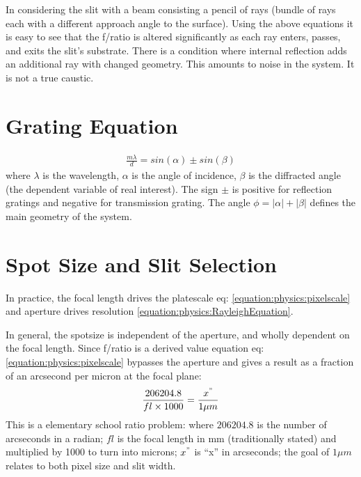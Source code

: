 \documentclass[letterpaper,10pt,english,openany,oneside]{sphinxmanual}
\begin{document}
\sphinxAtStartPar
In considering the  slit with a beam consisting a pencil of rays
(bundle of rays \textendash{} each with a different approach angle to the
surface). Using the above equations it is easy to see that the f/ratio
is altered significantly as each ray enters, passes, and exits the
slit’s substrate. There is a condition where internal reflection adds
an additional ray with changed geometry.  This amounts to noise in the
system. It is not a true caustic.


\section{Grating Equation}
\label{\detokenize{physics:grating-equation}}\begin{equation}\label{equation:physics:grating}
\begin{split}\frac{m\lambda}{d} = sin(\alpha) \pm sin(\beta)\end{split}
\end{equation}
\sphinxAtStartPar
where \(\lambda\) is the wavelength, \(\alpha\) is the angle
of incidence, \(\beta\) is the diffracted angle (the dependent
variable of real interest). The sign \(\pm\) is positive for
reflection gratings and negative for transmission grating. The angle
\(\phi = |\alpha| + |\beta|\) defines the main geometry of the
system.


\section{Spot Size and Slit Selection}
\label{\detokenize{physics:spot-size-and-slit-selection}}
\sphinxAtStartPar
In practice, the focal length drives the platescale eq: \eqref{equation:physics:pixelscale}
and aperture drives resolution \eqref{equation:physics:RayleighEquation}.

\sphinxAtStartPar
In general, the spot\sphinxhyphen{}size is independent of the aperture, and
wholly dependent on the focal length. Since f/ratio is a derived value
\textendash{} equation eq: \eqref{equation:physics:pixelscale} bypasses the aperture and gives a result
as a fraction of an arcsecond per micron at the focal plane:
\begin{equation}\label{equation:physics:pixelscale}
\begin{split}\frac{206204.8}{fl\times 1000} = \frac{x^"}{1 \mu{m}}\end{split}
\end{equation}
\sphinxAtStartPar
This is a elementary school ratio problem: where \(206204.8\) is
the number of arc\sphinxhyphen{}seconds in a radian; \(fl\) is the focal length
in mm (traditionally stated) and multiplied by 1000 to turn into
microns; \(x^"\) is “x” in arc\sphinxhyphen{}seconds; the goal of \(1 \mu{m}\)
relates to both pixel size and slit width.
\end{document}
